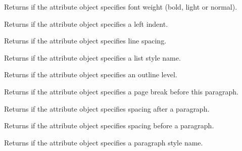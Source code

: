 Returns \true if the attribute object specifies font weight (bold, light or normal).

\label{wxtextattrhasleftindent}


Returns \true if the attribute object specifies a left indent.

\label{wxtextattrhaslinespacing}


Returns \true if the attribute object specifies line spacing.

\label{wxtextattrhasliststylename}


Returns \true if the attribute object specifies a list style name.

\label{wxtextattrhasoutlinelevel}


Returns \true if the attribute object specifies an outline level.

\label{wxtextattrhaspagebreak}


Returns \true if the attribute object specifies a page break before this paragraph.

\label{wxtextattrhasparagraphspacingafter}


Returns \true if the attribute object specifies spacing after a paragraph.

\label{wxtextattrhasparagraphspacingbefore}


Returns \true if the attribute object specifies spacing before a paragraph.

\label{wxtextattrhasparagraphstylename}


Returns \true if the attribute object specifies a paragraph style name.


